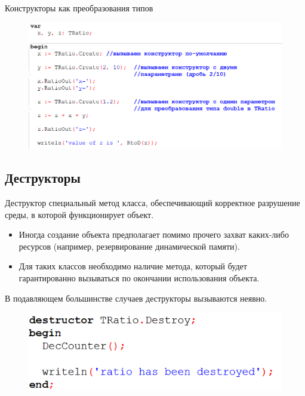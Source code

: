 \documentclass{beamer}
\begin{document}
\begin{frame}{Конструкторы как преобразования типов}
\begin{figure}[h]
\centering
\includegraphics[scale=0.4]{images/lec05-pic11.png}
\end{figure}
\end{frame}

\subsection{Деструкторы}
\begin{frame}
\begin{block}{Деструктор}
специальный метод класса, обеспечивающий корректное разрушение среды, в которой функционирует объект.
\end{block}
\begin{itemize}
\item Иногда создание объекта предполагает помимо прочего захват каких-либо ресурсов (например, резервирование динамической памяти).
\item Для таких классов необходимо наличие метода, который будет гарантированно вызываться по окончании использования объекта.
\end{itemize}
В подавляющем большинстве случаев деструкторы вызываются неявно.
\begin{figure}[h]
\centering
\includegraphics[scale=0.4]{images/lec05-pic12.png}
\end{figure}
\end{frame}
\end{document}
